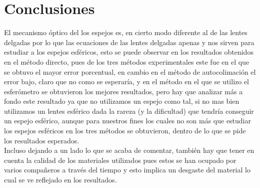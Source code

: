 \documentclass[13,twocolumn,letterpaper]{article}
\begin{document}
\section*{Conclusiones}
{
El mecanismo óptico del los espejos es, en cierto modo diferente al de las lentes delgadas por lo que las ecuaciones de las lentes delgadas apenas y nos sirven para estudiar a los espejos esféricos, esto se puede observar en los resultados obtenidos en el método directo, pues de los tres métodos experimentales este fue en el que se obtuvo el mayor error porcentual, en cambio en el método de autocolimación el error bajo, claro que no como se esperaría, y en el método en el que se utilizo el esferómetro se obtuvieron los mejores resultados, pero hay que analizar más a fondo este resultado ya que no utilizamos un espejo como tal, si no mas bien utilizamos un lentes esférico dada la rareza (y la dificultad) que tendría conseguir un espejo esférico, aunque para nuestros fines los cuales no son más que estudiar los espejos esféricos en los tres métodos se obtuvieron, dentro de lo que se pide los resultados esperados.
\\ Incluso  dejando a un lado lo que se acaba de comentar, también hay que tener en cuenta la calidad de los materiales utilizados pues estos se han ocupado por varios compañeros a través del tiempo y esto implica un desgaste del material lo cual se ve reflejado en los resultados. 

}


\nocite{Hecht}\nocite{Rossi}\nocite{Sears}\nocite{Born}\nocite{Tipler}\nocite{Feynman}\nocite{Res}


\end{document}
